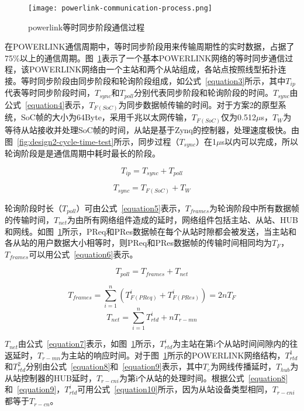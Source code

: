 \begin{figure}[!htb]
  \centering
  \texttt{[image: powerlink-communication-process.png]}
  \caption{powerlink等时同步阶段通信过程}
  \label{fig:powerlink-communication-process}
\end{figure}

在POWERLINK通信周期中，等时同步阶段用来传输周期性的实时数据，占据了75\%以上的通信周期。图~\ref{fig:powerlink-communication-process}表示了一个基本POWERLINK网络的等时同步通信过程，该POWERLINK网络由一个主站和两个从站组成，各站点按照线型拓扑连接。等时同步阶段由同步阶段和轮询阶段组成，如公式~\ref{equation3}所示，其中$T_{ip}$代表等时同步阶段时间，$T_{sync}$和$T_{poll}$分别代表同步阶段和轮询阶段的时间。$T_{sync}$由公式~\ref{equation4}表示，$T_{F(SoC)}$为同步数据帧传输的时间。对于方案2的原型系统，SoC帧的大小为64Byte，采用千兆以太网传输，$T_{F(SoC)}$仅为0.512$\mu$s，$T_{W}$为等待从站接收并处理SoC帧的时间，从站是基于Zynq的控制器，处理速度极快。由图~\ref{fig:design2-cycle-time-test}所示，同步过程（$T_{sync}$）在1$\mu$s以内可以完成，所以轮询阶段是是通信周期中耗时最长的阶段。

\begin{equation}
\label{equation3}
T_{ip}=T_{sync}+T_{poll}
\end{equation}

\begin{equation}
\label{equation4}
T_{sync}=T_{F(SoC)}+T_{W}
\end{equation}

轮询阶段时长（$T_{poll}$）可由公式~\ref{equation5}表示，$T_{frames}$为轮询阶段中所有数据帧的传输时间，$T_{net}$为由所有网络组件造成的延时，网络组件包括主站、从站、HUB和网线。如图~\ref{fig:powerlink-communication-process}所示，PReq和PRes数据帧在每个从站时隙都会被发送，当主站和各从站的用户数据大小相等时，则PReq和PRes数据帧的传输时间相同均为$T_{F}$，$T_{frames}$可以用公式~\ref{equation6}表示。

\begin{equation}
\label{equation5}
T_{poll}=T_{frames}+T_{net}
\end{equation}

\begin{equation}
\label{equation6}
T_{frames}=\sum_{i=1}^n(T_{F(PReq)}^{i}+T_{F(PRes)}^{i})=2nT_{F}
\end{equation}
\begin{equation}
\label{equation7}
T_{net}=\sum_{i=1}^nT_{rtd}^{i}+nT_{r-mn}
\end{equation}

$T_{net}$由公式~\ref{equation7}表示，如图~\ref{fig:powerlink-communication-process}所示，$T_{rtd}^{i}$为主站在第i个从站时间间隙内的往返延时，$T_{r-mn}$为主站的响应时间。对于图~\ref{fig:powerlink-communication-process}所示的POWERLINK网络结构，$T_{rtd}^{1}$和$T_{rtd}^{2}$分别由公式~\ref{equation8}和~\ref{equation9}表示，其中$T_{c}$为网线传播延时，$T_{hub}$为从站控制器的HUB延时，$T_{r-cni}$为第i个从站的处理时间。根据公式~\ref{equation8}和~\ref{equation9}，$T_{rtd}^{i}$可用公式~\ref{equation10}所示，因为从站设备类型相同，$T_{r-cni}$都等于$T_{r-cn}$。


